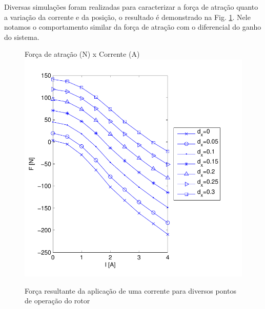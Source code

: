 




Diversas simulações foram realizadas para caracterizar a força de atração quanto a variação da corrente e da posição, o resultado é demonstrado na Fig. \ref{ativo_otimizado_fem_I_dx_map}. Nele notamos o comportamento similar da força de atração com o diferencial do ganho do sistema.

\begin{figure}[t!]
\centering
Força de atração (N) x Corrente (A)
\includegraphics[width=0.8\linewidth]{Figs/Simulacoes/Ativo/ativo_otimizado_fem_I_dx_map.pdf}
\caption{Força resultante da aplicação de uma corrente  para diversos pontos de operação do rotor}
\label{ativo_otimizado_fem_I_dx_map}
\end{figure}

